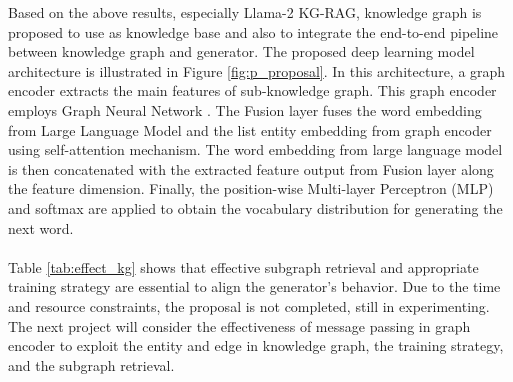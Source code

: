 
Based on the above results, especially Llama-2 KG-RAG, knowledge graph is proposed to use as knowledge base and also to integrate the end-to-end pipeline between knowledge graph and generator. The proposed deep learning model architecture is illustrated in Figure \ref{fig:p_proposal}. In this architecture, a graph encoder extracts the main features of sub-knowledge graph. This graph encoder employs Graph Neural Network \cite{4700287}. The Fusion layer fuses the word embedding from Large Language Model and the list entity embedding from graph encoder using self-attention mechanism. The word embedding from large language model is then concatenated with the extracted feature output from Fusion layer along the feature dimension. Finally, the position-wise Multi-layer Perceptron (MLP) and softmax are applied to obtain the vocabulary distribution for generating the next word.\\\\
Table \ref{tab:effect_kg} shows that effective subgraph retrieval and appropriate training strategy are essential to align the generator’s behavior. Due to the time and resource constraints, the proposal is not completed, still in experimenting. The next project will consider the effectiveness of message passing in graph encoder to exploit the entity and edge in knowledge graph, the training strategy, and the subgraph retrieval.